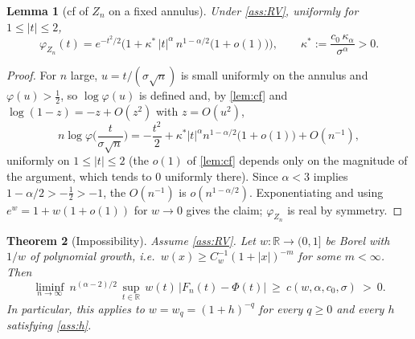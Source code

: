 \documentclass[11pt,a4paper]{article}
\theoremstyle{plain}
\newtheorem{theorem}{Theorem}[section]
\newtheorem{lemma}[theorem]{Lemma}
\theoremstyle{definition}
\theoremstyle{remark}
\numberwithin{equation}{section}
\newcommand{\R}{\mathbb{R}}
\newcommand{\1}{\mathbbm{1}}
\newcommand{\h}{h}
\begin{document}
\begin{lemma}[cf of $Z_n$ on a fixed annulus]\label{lem:cfZn}
Under \cref{ass:RV}, uniformly for $1\le|t|\le2$,
\[
\varphi_{Z_n}(t)=e^{-t^2/2}\Big(1+\kappa^\ast\,|t|^\alpha\,n^{1-\alpha/2}\big(1+o(1)\big)\Big),
\qquad \kappa^\ast:=\frac{c_0\,\kappa_\alpha}{\sigma^\alpha}>0 .
\]
\end{lemma}

\begin{proof}
For $n$ large, $u=t/(\sigma\sqrt n)$ is small uniformly on the annulus and
$\varphi(u)>\tfrac12$, so $\log\varphi(u)$ is defined and, by \cref{lem:cf} and
$\log(1-z)=-z+O(z^2)$ with $z=O(u^2)$,
\[
n\log\varphi\!\Big(\frac{t}{\sigma\sqrt n}\Big)
=-\frac{t^2}{2}
+\kappa^\ast|t|^\alpha n^{1-\alpha/2}\big(1+o(1)\big)
+O(n^{-1}),
\]
uniformly on $1\le|t|\le2$ (the $o(1)$ of \cref{lem:cf} depends only on the magnitude
of the argument, which tends to $0$ uniformly there). Since $\alpha<3$ implies
$1-\alpha/2>-\tfrac12>-1$, the $O(n^{-1})$ is $o(n^{1-\alpha/2})$. Exponentiating and
using $e^w=1+w(1+o(1))$ for $w\to0$ gives the claim; $\varphi_{Z_n}$ is real by
symmetry.
\end{proof}

\begin{theorem}[Impossibility]\label{thm:lower}
Assume \cref{ass:RV}. Let $w:\R\to(0,1]$ be Borel with $1/w$ of polynomial growth,
i.e.\ $w(x)\ge C_w^{-1}(1+|x|)^{-m}$ for some $m<\infty$. Then
\[
\liminf_{n\to\infty}\ n^{(\alpha-2)/2}\,
\sup_{t\in\R}\,w(t)\,\big|F_n(t)-\Phi(t)\big|\ \ge\ c(w,\alpha,c_0,\sigma)\ >\ 0 .
\]
In particular, this applies to $w=w_q=(1+\h)^{-q}$ for every $q\ge0$ and every $\h$
satisfying \cref{ass:h}.
\end{theorem}
\end{document}
